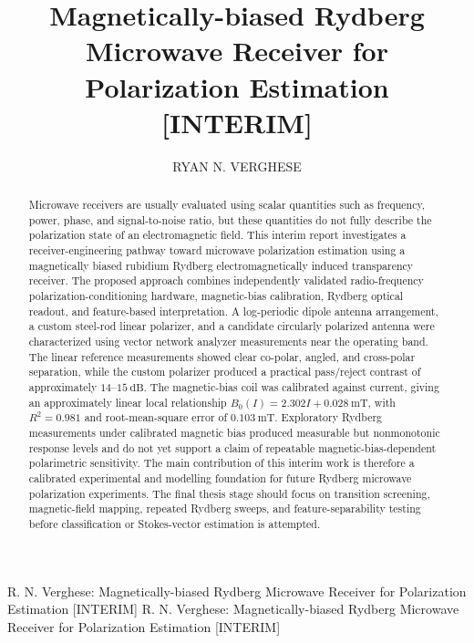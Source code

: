 \documentclass{ieeeaccess}
\begin{document}
\title{Magnetically-biased Rydberg Microwave Receiver for Polarization Estimation [INTERIM]}
\author{\uppercase{Ryan N. Verghese}}
\address[1]{School of Engineering and Technology, University of New South Wales, Canberra, ACT 2600 Australia}
\markboth
{R. N. Verghese: Magnetically-biased Rydberg Microwave Receiver for Polarization Estimation [INTERIM]}
{R. N. Verghese: Magnetically-biased Rydberg Microwave Receiver for Polarization Estimation [INTERIM]}


\begin{abstract}
Microwave receivers are usually evaluated using scalar quantities such as frequency, power, phase, and signal-to-noise ratio, but these quantities do not fully describe the polarization state of an electromagnetic field. This interim report investigates a receiver-engineering pathway toward microwave polarization estimation using a magnetically biased rubidium Rydberg electromagnetically induced transparency receiver. The proposed approach combines independently validated radio-frequency polarization-conditioning hardware, magnetic-bias calibration, Rydberg optical readout, and feature-based interpretation. A log-periodic dipole antenna arrangement, a custom steel-rod linear polarizer, and a candidate circularly polarized antenna were characterized using vector network analyzer measurements near the operating band. The linear reference measurements showed clear co-polar, angled, and cross-polar separation, while the custom polarizer produced a practical pass/reject contrast of approximately \(14\text{--}15~\mathrm{dB}\). The magnetic-bias coil was calibrated against current, giving an approximately linear local relationship \(B_0(I)=2.302I+0.028~\mathrm{mT}\), with \(R^2=0.981\) and root-mean-square error of \(0.103~\mathrm{mT}\). Exploratory Rydberg measurements under calibrated magnetic bias produced measurable but nonmonotonic response levels and do not yet support a claim of repeatable magnetic-bias-dependent polarimetric sensitivity. The main contribution of this interim work is therefore a calibrated experimental and modelling foundation for future Rydberg microwave polarization experiments. The final thesis stage should focus on transition screening, magnetic-field mapping, repeated Rydberg sweeps, and feature-separability testing before classification or Stokes-vector estimation is attempted.
\end{abstract}
\end{document}
